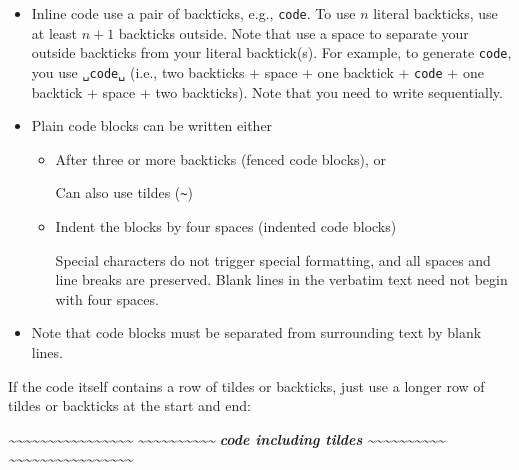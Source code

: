 \documentclass[
  a4paper,
  twoside,
  openright]{book}
\newenvironment{Shaded}{\begin{snugshade}}{\end{snugshade}}
\newcommand{\InformationTok}[1]{\textcolor[rgb]{0.56,0.35,0.01}{\textbf{\textit{#1}}}}
\theoremstyle{definition}
\theoremstyle{definition}
\theoremstyle{definition}
\theoremstyle{definition}
\theoremstyle{remark}
\begin{document}
\begin{itemize}
\item
  Inline code use a pair of backticks, e.g., \texttt{\textasciigrave{}code\textasciigrave{}}. To use \(n\) literal backticks, use at least \(n+1\) backticks outside. Note that use a space to separate your outside backticks from your literal backtick(s). For example, to generate \texttt{\textasciigrave{}code\textasciigrave{}}, you use \texttt{\textasciigrave{}\textasciigrave{}␣\textasciigrave{}code\textasciigrave{}␣\textasciigrave{}\textasciigrave{}} (i.e., two backticks + space + one backtick + \texttt{code} + one backtick + space + two backticks). Note that you need to write sequentially.
\item
  Plain code blocks can be written either

  \begin{itemize}
  \item
    After three or more backticks (fenced code blocks), or

    Can also use tildes (\texttt{\textasciitilde{}})
  \item
    Indent the blocks by four spaces (indented code blocks)

    Special characters do not trigger special formatting, and all spaces and line breaks are preserved. Blank lines in the verbatim text need not begin with four spaces.
  \end{itemize}
\item
  Note that code blocks must be separated from surrounding text by blank lines.
\end{itemize}

If the code itself contains a row of tildes or backticks, just use a longer row of tildes or backticks at the start and end:

\begin{Shaded}
\begin{Highlighting}[]
\InformationTok{\textasciitilde{}\textasciitilde{}\textasciitilde{}\textasciitilde{}\textasciitilde{}\textasciitilde{}\textasciitilde{}\textasciitilde{}\textasciitilde{}\textasciitilde{}\textasciitilde{}\textasciitilde{}\textasciitilde{}\textasciitilde{}\textasciitilde{}\textasciitilde{}}
\InformationTok{\textasciitilde{}\textasciitilde{}\textasciitilde{}\textasciitilde{}\textasciitilde{}\textasciitilde{}\textasciitilde{}\textasciitilde{}\textasciitilde{}\textasciitilde{}}
\InformationTok{code including tildes}
\InformationTok{\textasciitilde{}\textasciitilde{}\textasciitilde{}\textasciitilde{}\textasciitilde{}\textasciitilde{}\textasciitilde{}\textasciitilde{}\textasciitilde{}\textasciitilde{}}
\InformationTok{\textasciitilde{}\textasciitilde{}\textasciitilde{}\textasciitilde{}\textasciitilde{}\textasciitilde{}\textasciitilde{}\textasciitilde{}\textasciitilde{}\textasciitilde{}\textasciitilde{}\textasciitilde{}\textasciitilde{}\textasciitilde{}\textasciitilde{}\textasciitilde{}}
\end{Highlighting}
\end{Shaded}
\end{document}
